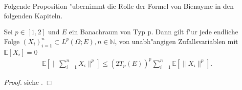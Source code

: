 Folgende Proposition "ubernimmt die Rolle der Formel von Bienayme in den folgenden Kapiteln.
\begin{prop}\label{Ung}
Sei $p\in [1,2]$ und $E$ ein Banachraum von Typ p. Dann gilt f"ur jede endliche Folge $(X_i)^n_{i=1}\subset L^p(\Omega;E),n\in \mathbb{N}$, von unabh"angigen Zufallsvariablen mit $\mathbb{E}[X_i]=0$
\begin{align*}
\mathbb{E}\left[\Big\|\sum_{i=1}^nX_i\Big\|^p\right]\leq (2T_p(E))^p\sum_{i=1}^n\mathbb{E}[\|X_i\|^p].
\end{align*}
\end{prop}
\begin{proof}
siehe \cite{Heinrich}.
\end{proof}
